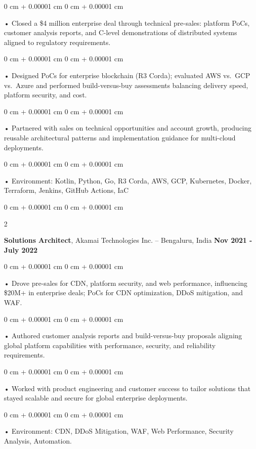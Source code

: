 \documentclass[10pt, letterpaper]{article}
\newenvironment{onecolentry}{
    \begin{adjustwidth}{
        0 cm + 0.00001 cm
    }{
        0 cm + 0.00001 cm
    }
}{
    \end{adjustwidth}
} %
\newenvironment{twocolentry}[2][]{
    \onecolentry
    \def\secondColumn{#2}
    \setcolumnwidth{\fill, 4.5 cm}
    \begin{paracol}{2}
}{
    \switchcolumn \raggedleft \secondColumn
    \end{paracol}
    \endonecolentry
} %
\begin{document}
        \begin{onecolentry}
             • Closed a \$4 million enterprise deal through technical pre-sales: platform PoCs, customer analysis reports, and C-level demonstrations of distributed systems aligned to regulatory requirements.
        \end{onecolentry}
        \begin{onecolentry}
             • Designed PoCs for enterprise blockchain (R3 Corda); evaluated AWS vs.\ GCP vs.\ Azure and performed build-versus-buy assessments balancing delivery speed, platform security, and cost.
        \end{onecolentry}
        \begin{onecolentry}
             • Partnered with sales on technical opportunities and account growth, producing reusable architectural patterns and implementation guidance for multi-cloud deployments.
        \end{onecolentry}
        \begin{onecolentry}
             • Environment: Kotlin, Python, Go, R3 Corda, AWS, GCP, Kubernetes, Docker, Terraform, Jenkins, GitHub Actions, IaC
        \end{onecolentry}
        \vspace{0.1cm}

        \begin{twocolentry}{
            \textbf{Nov 2021 - July 2022}
        }
            \textbf{Solutions Architect}, Akamai Technologies Inc. -- Bengaluru, India \end{twocolentry}
        \begin{onecolentry}
            • Drove pre-sales for CDN, platform security, and web performance, influencing \$20M+ in enterprise deals; PoCs for CDN optimization, DDoS mitigation, and WAF.
        \end{onecolentry}
        \begin{onecolentry}
             • Authored customer analysis reports and build-versus-buy proposals aligning global platform capabilities with performance, security, and reliability requirements.
        \end{onecolentry}
        \begin{onecolentry}
             • Worked with product engineering and customer success to tailor solutions that stayed scalable and secure for global enterprise deployments.
        \end{onecolentry}
        \begin{onecolentry}
             • Environment: CDN, DDoS Mitigation, WAF, Web Performance, Security Analysis, Automation.
        \end{onecolentry}
\end{document}
